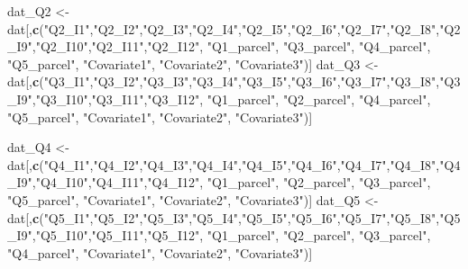 \documentclass[
]{book}
\newenvironment{Shaded}{\begin{snugshade}}{\end{snugshade}}
\newcommand{\KeywordTok}[1]{\textcolor[rgb]{0.13,0.29,0.53}{\textbf{#1}}}
\newcommand{\NormalTok}[1]{#1}
\newcommand{\StringTok}[1]{\textcolor[rgb]{0.31,0.60,0.02}{#1}}
\begin{document}
\begin{Shaded}
\begin{Highlighting}[]
\NormalTok{dat_Q2 <-}\StringTok{ }\NormalTok{dat[,}\KeywordTok{c}\NormalTok{(}\StringTok{"Q2_I1"}\NormalTok{,}\StringTok{"Q2_I2"}\NormalTok{,}\StringTok{"Q2_I3"}\NormalTok{,}\StringTok{"Q2_I4"}\NormalTok{,}\StringTok{"Q2_I5"}\NormalTok{,}\StringTok{"Q2_I6"}\NormalTok{,}\StringTok{"Q2_I7"}\NormalTok{,}\StringTok{"Q2_I8"}\NormalTok{,}\StringTok{"Q2_I9"}\NormalTok{,}\StringTok{"Q2_I10"}\NormalTok{,}\StringTok{"Q2_I11"}\NormalTok{,}\StringTok{"Q2_I12"}\NormalTok{, }
                    \StringTok{"Q1_parcel"}\NormalTok{, }\StringTok{"Q3_parcel"}\NormalTok{, }\StringTok{"Q4_parcel"}\NormalTok{, }\StringTok{"Q5_parcel"}\NormalTok{,}
                    \StringTok{"Covariate1"}\NormalTok{, }\StringTok{"Covariate2"}\NormalTok{, }\StringTok{"Covariate3"}\NormalTok{)]}
\NormalTok{dat_Q3 <-}\StringTok{ }\NormalTok{dat[,}\KeywordTok{c}\NormalTok{(}\StringTok{"Q3_I1"}\NormalTok{,}\StringTok{"Q3_I2"}\NormalTok{,}\StringTok{"Q3_I3"}\NormalTok{,}\StringTok{"Q3_I4"}\NormalTok{,}\StringTok{"Q3_I5"}\NormalTok{,}\StringTok{"Q3_I6"}\NormalTok{,}\StringTok{"Q3_I7"}\NormalTok{,}\StringTok{"Q3_I8"}\NormalTok{,}\StringTok{"Q3_I9"}\NormalTok{,}\StringTok{"Q3_I10"}\NormalTok{,}\StringTok{"Q3_I11"}\NormalTok{,}\StringTok{"Q3_I12"}\NormalTok{, }
                    \StringTok{"Q1_parcel"}\NormalTok{, }\StringTok{"Q2_parcel"}\NormalTok{, }\StringTok{"Q4_parcel"}\NormalTok{, }\StringTok{"Q5_parcel"}\NormalTok{,}
                    \StringTok{"Covariate1"}\NormalTok{, }\StringTok{"Covariate2"}\NormalTok{, }\StringTok{"Covariate3"}\NormalTok{)]}

\NormalTok{dat_Q4 <-}\StringTok{ }\NormalTok{dat[,}\KeywordTok{c}\NormalTok{(}\StringTok{"Q4_I1"}\NormalTok{,}\StringTok{"Q4_I2"}\NormalTok{,}\StringTok{"Q4_I3"}\NormalTok{,}\StringTok{"Q4_I4"}\NormalTok{,}\StringTok{"Q4_I5"}\NormalTok{,}\StringTok{"Q4_I6"}\NormalTok{,}\StringTok{"Q4_I7"}\NormalTok{,}\StringTok{"Q4_I8"}\NormalTok{,}\StringTok{"Q4_I9"}\NormalTok{,}\StringTok{"Q4_I10"}\NormalTok{,}\StringTok{"Q4_I11"}\NormalTok{,}\StringTok{"Q4_I12"}\NormalTok{, }
                    \StringTok{"Q1_parcel"}\NormalTok{, }\StringTok{"Q2_parcel"}\NormalTok{, }\StringTok{"Q3_parcel"}\NormalTok{, }\StringTok{"Q5_parcel"}\NormalTok{,}
                    \StringTok{"Covariate1"}\NormalTok{, }\StringTok{"Covariate2"}\NormalTok{, }\StringTok{"Covariate3"}\NormalTok{)]}
\NormalTok{dat_Q5 <-}\StringTok{ }\NormalTok{dat[,}\KeywordTok{c}\NormalTok{(}\StringTok{"Q5_I1"}\NormalTok{,}\StringTok{"Q5_I2"}\NormalTok{,}\StringTok{"Q5_I3"}\NormalTok{,}\StringTok{"Q5_I4"}\NormalTok{,}\StringTok{"Q5_I5"}\NormalTok{,}\StringTok{"Q5_I6"}\NormalTok{,}\StringTok{"Q5_I7"}\NormalTok{,}\StringTok{"Q5_I8"}\NormalTok{,}\StringTok{"Q5_I9"}\NormalTok{,}\StringTok{"Q5_I10"}\NormalTok{,}\StringTok{"Q5_I11"}\NormalTok{,}\StringTok{"Q5_I12"}\NormalTok{, }
                    \StringTok{"Q1_parcel"}\NormalTok{, }\StringTok{"Q2_parcel"}\NormalTok{, }\StringTok{"Q3_parcel"}\NormalTok{, }\StringTok{"Q4_parcel"}\NormalTok{,}
                    \StringTok{"Covariate1"}\NormalTok{, }\StringTok{"Covariate2"}\NormalTok{, }\StringTok{"Covariate3"}\NormalTok{)]}
\end{Highlighting}
\end{Shaded}
\end{document}
